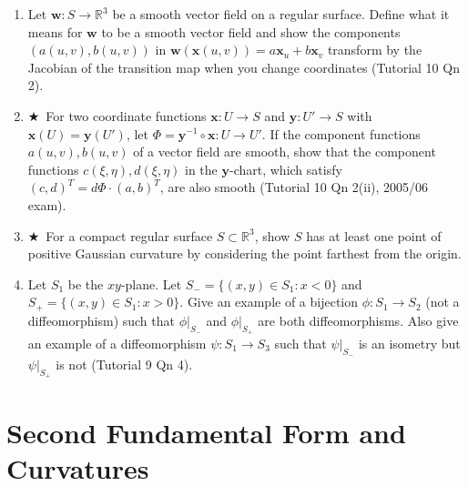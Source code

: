 \documentclass[11pt, a4paper]{article}
\newcommand{\R}{\mathbb{R}}
\newcommand{\hard}{$\bigstar$\ }
\begin{document}
\begin{enumerate}[label=\textbf{Q\arabic*.}, leftmargin=*, itemsep=6pt]
\item Let $\mathbf{w}:S\to\R^3$ be a smooth vector field on a regular surface. Define what it means for $\mathbf{w}$ to be a smooth vector field and show the components $(a(u,v),b(u,v))$ in $\mathbf{w}(\mathbf{x}(u,v))=a\mathbf{x}_u+b\mathbf{x}_v$ transform by the Jacobian of the transition map when you change coordinates (Tutorial 10 Qn 2).

\item \hard For two coordinate functions $\mathbf{x}:U\to S$ and $\mathbf{y}:U'\to S$ with $\mathbf{x}(U)=\mathbf{y}(U')$, let $\Phi=\mathbf{y}^{-1}\circ\mathbf{x}:U\to U'$. If the component functions $a(u,v),b(u,v)$ of a vector field are smooth, show that the component functions $c(\xi,\eta),d(\xi,\eta)$ in the $\mathbf{y}$-chart, which satisfy $(c,d)^T=d\Phi\cdot(a,b)^T$, are also smooth (Tutorial 10 Qn 2(ii), 2005/06 exam).

\item \hard For a compact regular surface $S\subset\R^3$, show $S$ has at least one point of positive Gaussian curvature by considering the point farthest from the origin.

\item Let $S_1$ be the $xy$-plane. Let $S_-=\{(x,y)\in S_1:x<0\}$ and $S_+=\{(x,y)\in S_1:x>0\}$. Give an example of a bijection $\phi:S_1\to S_2$ (not a diffeomorphism) such that $\phi|_{S_-}$ and $\phi|_{S_+}$ are both diffeomorphisms. Also give an example of a diffeomorphism $\psi:S_1\to S_3$ such that $\psi|_{S_-}$ is an isometry but $\psi|_{S_+}$ is not (Tutorial 9 Qn 4).

\end{enumerate}

\section{Second Fundamental Form and Curvatures}
\end{document}

